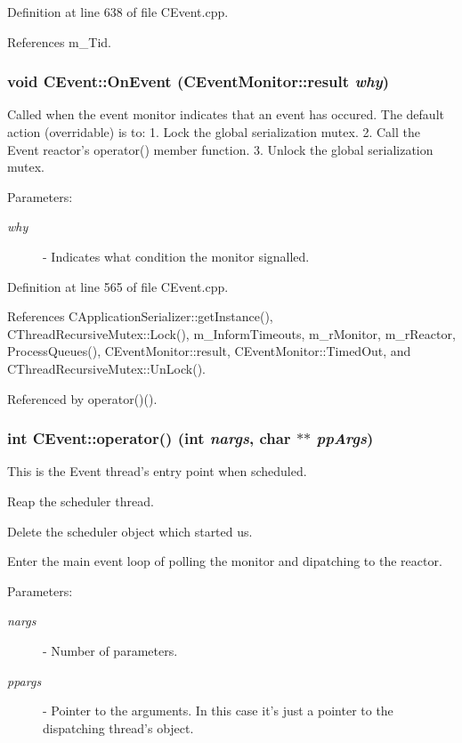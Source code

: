 Definition at line 638 of file CEvent.cpp.

References m\_\-Tid.
\subsubsection{\setlength{\rightskip}{0pt plus 5cm}void CEvent::On\-Event ({\bf CEvent\-Monitor::result} {\em why})\hspace{0.3cm}{\tt  [protected, virtual]}}\label{classCEvent_b2}


Called when the event monitor indicates that an event has occured. The default action (overridable) is to: 1. Lock the global serialization mutex. 2. Call the Event reactor's operator() member function. 3. Unlock the global serialization mutex.\begin{Desc}
\item[Parameters: ]\par
\begin{description}
\item[{\em 
why}]- Indicates what condition the monitor signalled. \end{description}
\end{Desc}


Definition at line 565 of file CEvent.cpp.

References CApplication\-Serializer::get\-Instance(), CThread\-Recursive\-Mutex::Lock(), m\_\-Inform\-Timeouts, m\_\-r\-Monitor, m\_\-r\-Reactor, Process\-Queues(), CEvent\-Monitor::result, CEvent\-Monitor::Timed\-Out, and CThread\-Recursive\-Mutex::Un\-Lock().

Referenced by operator()().
\subsubsection{\setlength{\rightskip}{0pt plus 5cm}int CEvent::operator() (int {\em nargs}, char $\ast$$\ast$ {\em pp\-Args})\hspace{0.3cm}{\tt  [protected, virtual]}}\label{classCEvent_b4}


This is the Event thread's entry point when scheduled. \begin{CompactItemize}
\item 
Reap the scheduler thread.\item 
Delete the scheduler object which started us.\item 
Enter the main event loop of polling the monitor and dipatching to the  reactor.\end{CompactItemize}
\begin{Desc}
\item[Parameters: ]\par
\begin{description}
\item[{\em 
nargs}]- Number of parameters. \item[{\em 
ppargs}]- Pointer to the arguments. In this case it's just a pointer to the dispatching thread's object. \end{description}
\end{Desc}


